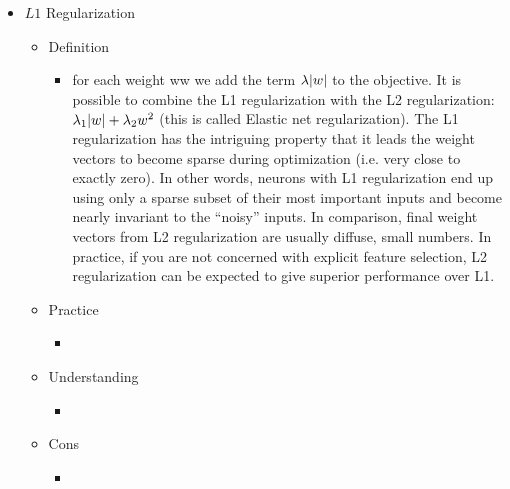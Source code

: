 \begin{itemize}
\item $L1$ Regularization
	\begin{itemize}
	\item Definition
		\begin{itemize}
		\item for each weight ww we add the term $\lambda \lvert w\rvert$ to the objective. It is possible to combine the L1 regularization with the L2 regularization: $\lambda_1 \lvert w\rvert + \lambda_2 w^2$ (this is called Elastic net regularization). The L1 regularization has the intriguing property that it leads the weight vectors to become sparse during optimization (i.e. very close to exactly zero). In other words, neurons with L1 regularization end up using only a sparse subset of their most important inputs and become nearly invariant to the “noisy” inputs. In comparison, final weight vectors from L2 regularization are usually diffuse, small numbers. In practice, if you are not concerned with explicit feature selection, L2 regularization can be expected to give superior performance over L1.
		\end{itemize}
	\item Practice
		\begin{itemize}
		\item 
		\end{itemize}
	\item Understanding
		\begin{itemize}
		\item 
		\end{itemize}
	\item Cons
		\begin{itemize}
		\item 
		\end{itemize}
	\end{itemize}


\end{itemize}
